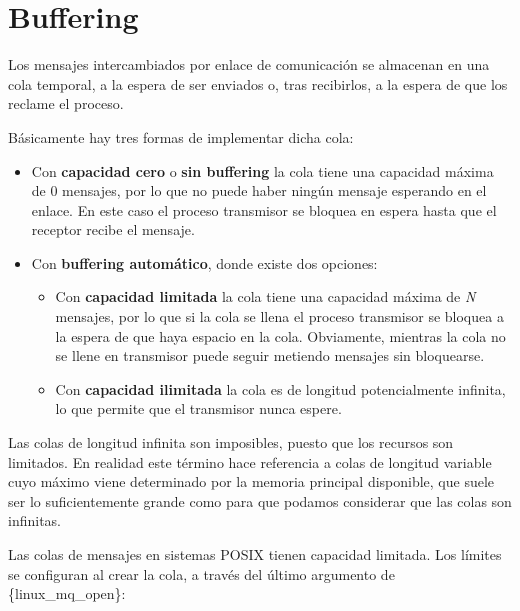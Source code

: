 \section{Buffering}\label{_buffering}

{} Los mensajes intercambiados por enlace de comunicación se almacenan
en una cola temporal, a la espera de ser enviados o, tras recibirlos, a
la espera de que los reclame el proceso.

Básicamente hay tres formas de implementar dicha cola:

\begin{itemize}
\item
  Con \textbf{capacidad cero}{} o \textbf{sin buffering} la cola tiene
  una capacidad máxima de 0 mensajes, por lo que no puede haber ningún
  mensaje esperando en el enlace. En este caso el proceso transmisor se
  bloquea en espera hasta que el receptor recibe el mensaje.
\item
  Con \textbf{buffering automático}{}, donde existe dos opciones:

  \begin{itemize}
  \item
    Con \textbf{capacidad limitada}{} la cola tiene una capacidad máxima
    de \emph{N} mensajes, por lo que si la cola se llena el proceso
    transmisor se bloquea a la espera de que haya espacio en la cola.
    Obviamente, mientras la cola no se llene en transmisor puede seguir
    metiendo mensajes sin bloquearse.
  \item
    Con \textbf{capacidad ilimitada}{} la cola es de longitud
    potencialmente infinita, lo que permite que el transmisor nunca
    espere.
  \end{itemize}
\end{itemize}

Las colas de longitud infinita son imposibles, puesto que los recursos
son limitados. En realidad este término hace referencia a colas de
longitud variable cuyo máximo viene determinado por la memoria principal
disponible, que suele ser lo suficientemente grande como para que
podamos considerar que las colas son infinitas.

Las colas de mensajes en sistemas POSIX tienen capacidad limitada. Los
límites se configuran al crear la cola, a través del último argumento de
\{linux\_mq\_open\}:

\begin{Shaded}
\begin{Highlighting}[]
\OperatorTok{=} \OperatorTok{\{}  
    \OperatorTok{=} \OperatorTok{,}      
    \OperatorTok{=}    
\OperatorTok{\};}

\OperatorTok{=}\OperatorTok{(}
    \OperatorTok{,}
\OperatorTok{|}\OperatorTok{,}
    \OperatorTok{,}
    \OperatorTok{\&}
\OperatorTok{);}
\end{Highlighting}
\end{Shaded}

